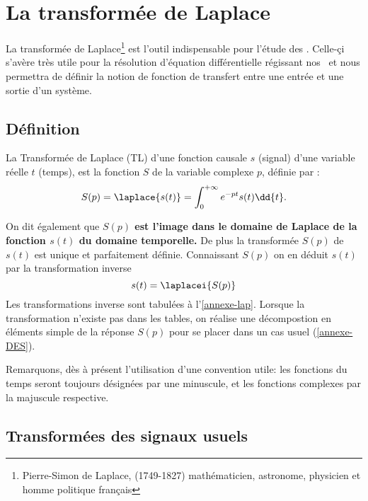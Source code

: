 \section{La transformée de Laplace}
La transformée de Laplace\footnote{Pierre-Simon de Laplace, (1749-1827) 
mathématicien, astronome, physicien et homme politique français} est l'outil indispensable 
pour l'étude des \SLCI. Celle-çi s'avère très utile pour 
la résolution d'équation différentielle régissant nos \SLCI~et nous permettra 
de définir la notion de fonction de transfert entre une entrée 
et une sortie d'un système.

\subsection{Définition}
La Transformée de Laplace (TL) d'une fonction causale $s$ (signal) 
d'une variable réelle $t$ (temps), est la fonction $S$ 
de la variable complexe $p$, définie par :
\begin{align}
S(p)=\laplace{s(t)}=\int_{0}^{+\infty} e^{-pt}s(t)\dd{t}.\label{eq-lap}
\end{align}


On dit également que \textbf{$S(p)$ est l'image dans le domaine de 
Laplace de la fonction $s(t)$ du domaine temporelle.}
De plus la transformée $S(p)$ de $s(t)$ est unique et parfaitement définie. 
Connaissant $S(p)$ on en déduit $s(t)$
par la transformation inverse 
$$
s(t)=\laplacei{S(p)}
$$
Les transformations inverse sont tabulées à l'\cref{annexe-lap}. Lorsque la transformation
n'existe pas dans les tables, on réalise une décompostion en éléments simple de la réponse 
$S(p)$ pour se placer dans un cas usuel (\cref{annexe-DES}).

Remarquons, dès à présent l'utilisation d'une convention utile: 
les fonctions du temps seront toujours désignées par une
minuscule, et les fonctions complexes par la majuscule respective.

\subsection{Transformées des signaux usuels}


